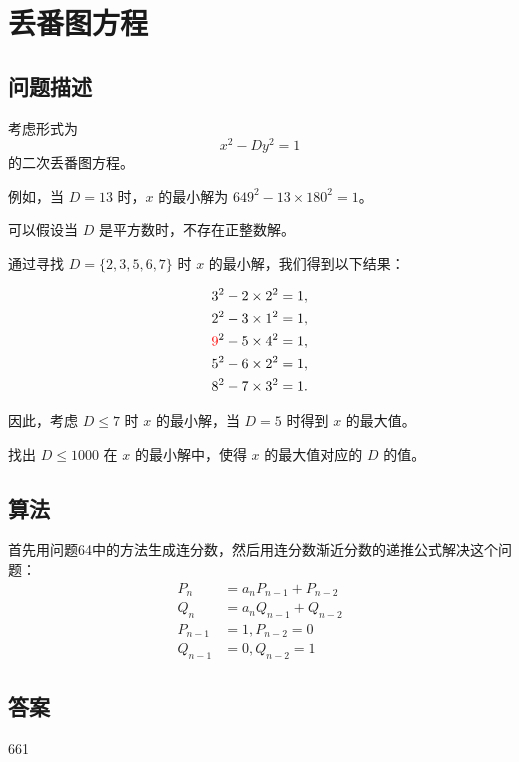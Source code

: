 \section{丢番图方程}\label{sec:problem66}
\subsection{问题描述}
\begin{tcolorbox}
	考虑形式为
	\[ x^2 - D y^2 = 1 \]
	的二次丢番图方程。

	例如，当 \( D = 13 \) 时，\( x \) 的最小解为 \( 649^2 - 13 \times 180^2 = 1 \)。

	可以假设当 \( D \) 是平方数时，不存在正整数解。

	通过寻找 \( D = \{2, 3, 5, 6, 7\} \) 时 \( x \) 的最小解，我们得到以下结果：

	\begin{align*}
		3^2 - 2 \times 2^2       & = 1, \\
		2^2 - 3 \times 1^2       & = 1, \\
		\textcolor{red}{9}^2 - 5 \times 4^2 & = 1, \\
		5^2 - 6 \times 2^2       & = 1, \\
		8^2 - 7 \times 3^2       & = 1.
	\end{align*}

	因此，考虑 \( D \leq 7 \) 时 \( x \) 的最小解，当 \( D = 5 \) 时得到 \( x \) 的最大值。

	找出 \( D \leq 1000 \) 在 \( x \) 的最小解中，使得 \( x \) 的最大值对应的 \( D \) 的值。

\end{tcolorbox}

\subsection{算法}
首先用问题64中的方法生成连分数，然后用连分数渐近分数的递推公式解决这个问题：
\begin{align*}
	P_n     & = a_nP_{n-1} + P_{n-2} \\
	Q_n     & = a_nQ_{n-1} + Q_{n-2} \\
	P_{n-1} & = 1, P_{n-2} = 0       \\
	Q_{n-1} & = 0, Q_{n-2} = 1
\end{align*}

\subsection{答案}
661
